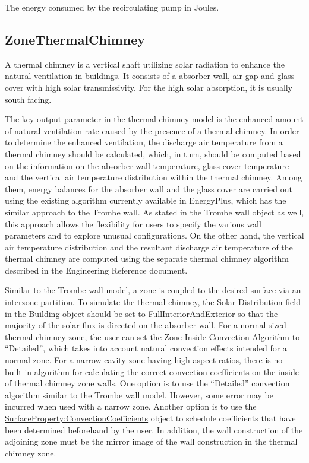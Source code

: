 The energy consumed by the recirculating pump in Joules.

\subsection{ZoneThermalChimney}\label{zonethermalchimney-thermal-chimney}

A thermal chimney is a vertical shaft utilizing solar radiation to enhance the natural ventilation in buildings. It consists of a absorber wall, air gap and glass cover with high solar transmissivity. For the high solar absorption, it is usually south facing.

The key output parameter in the thermal chimney model is the enhanced amount of natural ventilation rate caused by the presence of a thermal chimney. In order to determine the enhanced ventilation, the discharge air temperature from a thermal chimney should be calculated, which, in turn, should be computed based on the information on the absorber wall temperature, glass cover temperature and the vertical air temperature distribution within the thermal chimney. Among them, energy balances for the absorber wall and the glass cover are carried out using the existing algorithm currently available in EnergyPlus, which has the similar approach to the Trombe wall. As stated in the Trombe wall object as well, this approach allows the flexibility for users to specify the various wall parameters and to explore unusual configurations. On the other hand, the vertical air temperature distribution and the resultant discharge air temperature of the thermal chimney are computed using the separate thermal chimney algorithm described in the Engineering Reference document.

Similar to the Trombe wall model, a zone is coupled to the desired surface via an interzone partition. To simulate the thermal chimney, the Solar Distribution field in the Building object should be set to FullInteriorAndExterior so that the majority of the solar flux is directed on the absorber wall. For a normal sized thermal chimney zone, the user can set the Zone Inside Convection Algorithm to ``Detailed'', which takes into account natural convection effects intended for a normal zone. For a narrow cavity zone having high aspect ratios, there is no built-in algorithm for calculating the correct convection coefficients on the inside of thermal chimney zone walls. One option is to use the ``Detailed'' convection algorithm similar to the Trombe wall model. However, some error may be incurred when used with a narrow zone. Another option is to use the \hyperref[surfacepropertyconvectioncoefficients]{SurfaceProperty:ConvectionCoefficients} object to schedule coefficients that have been determined beforehand by the user. In addition, the wall construction of the adjoining zone must be the mirror image of the wall construction in the thermal chimney zone.

